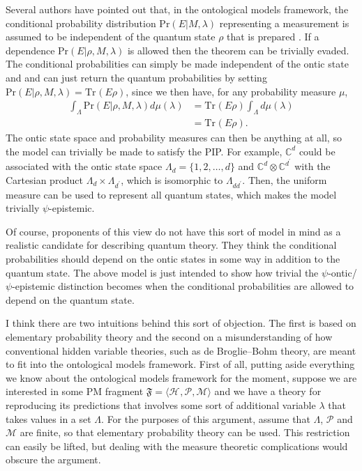 \documentclass[DIV=calc,paper=a4,fontsize=11pt,twocolumn]{scrartcl} %
\theoremstyle{definition}
\theoremstyle{plain}
\newcommand{\Hilb}[1][]{\ensuremath{\mathcal{H}_{#1}}}
\newcommand{\Tr}[2][]{\ensuremath{\text{Tr}_{#1} \left ( #2 \right )}}
\begin{document}
\label{Crit:Response}

Several authors have pointed out that, in the ontological models
framework, the conditional probability distribution
$\text{Pr}(E|M,\lambda)$ representing a measurement is assumed to be
independent of the quantum state $\rho$ that is prepared
\cite{Drezet2012, Drezet2012a, Schlosshauer2012}.  If a dependence
$\text{Pr}(E|\rho,M,\lambda)$ is allowed then the theorem can be
trivially evaded.  The conditional probabilities can simply be made
independent of the ontic state and and can just return the quantum
probabilities by setting $\text{Pr}(E|\rho,M,\lambda) = \Tr{E \rho}$,
since we then have, for any probability measure $\mu$,
\begin{align}
\int_{\Lambda} \text{Pr}(E|\rho,M,\lambda) d\mu(\lambda) & =
\Tr{E\rho} \int_{\Lambda} d\mu(\lambda) \\
& = \Tr{E\rho}.
\end{align}
The ontic state space and probability measures can then be anything at
all, so the model can trivially be made to satisfy the PIP\@.  For
example, $\mathbb{C}^d$ could be associated with the ontic state space
$\Lambda_d = \{1,2,\ldots,d\}$ and $\mathbb{C}^d \otimes
\mathbb{C}^{d^{\prime}}$ with the Cartesian product $\Lambda_d \times
\Lambda_{d^{\prime}}$, which is isomorphic to $\Lambda_{dd^{\prime}}$.
Then, the uniform measure can be used to represent all quantum states,
which makes the model trivially $\psi$-epistemic.

Of course, proponents of this view do not have this sort of model in
mind as a realistic candidate for describing quantum theory.  They
think the conditional probabilities should depend on the ontic states
in some way in addition to the quantum state.  The above model is just
intended to show how trivial the $\psi$-ontic/$\psi$-epistemic
distinction becomes when the conditional probabilities are allowed to
depend on the quantum state.

I think there are two intuitions behind this sort of objection.  The
first is based on elementary probability theory and the second on a
misunderstanding of how conventional hidden variable theories, such as
de Broglie--Bohm theory, are meant to fit into the ontological models
framework.  First of all, putting aside everything we know about the
ontological models framework for the moment, suppose we are interested
in some PM fragment $\mathfrak{F} = \langle \Hilb,
\mathcal{P}, \mathcal{M} \rangle$ and we have a theory for reproducing
its predictions that involves some sort of additional variable
$\lambda$ that takes values in a set $\Lambda$.  For the purposes of
this argument, assume that $\Lambda$, $\mathcal{P}$ and $\mathcal{M}$
are finite, so that elementary probability theory can be used.  This
restriction can easily be lifted, but dealing with the measure
theoretic complications would obscure the argument.
\end{document}
